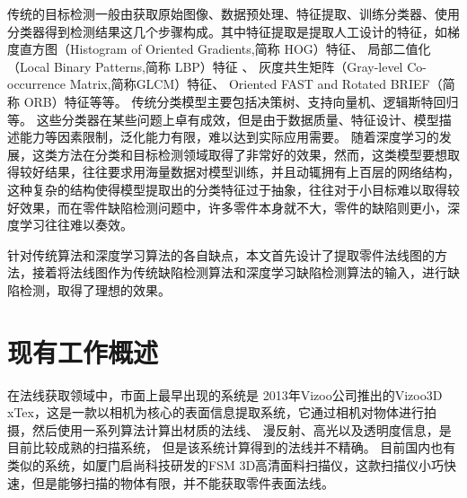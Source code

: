 传统的目标检测一般由获取原始图像、数据预处理、特征提取、训练分类器、使用分类器得到检测结果这几个步骤构成。其中特征提取是提取人工设计的特征，如梯度直方图\cite{dalal2005histograms}（Histogram of Oriented Gradients,简称 HOG）特征、
局部二值化\cite{ojala2000gray}（Local Binary Patterns,简称 LBP）特征
、
灰度共生矩阵\cite{haralick1973textural}（Gray-level Co-occurrence Matrix,简称GLCM）特征、
Oriented FAST and Rotated BRIEF\cite{rublee2011orb}（简称 ORB）特征等等。
传统分类模型主要包括决策树、支持向量机、逻辑斯特回归等。
这些分类器在某些问题上卓有成效，但是由于数据质量、特征设计、模型描述能力等因素限制，泛化能力有限，难以达到实际应用需要。
随着深度学习的发展，这类方法在分类和目标检测领域取得了非常好的效果，然而，这类模型要想取得较好结果，往往要求用海量数据对模型训练，并且动辄拥有上百层的网络结构，这种复杂的结构使得模型提取出的分类特征过于抽象，往往对于小目标难以取得较好效果，而在零件缺陷检测问题中，许多零件本身就不大，零件的缺陷则更小，深度学习往往难以奏效。

针对传统算法和深度学习算法的各自缺点，本文首先设计了提取零件法线图的方法，接着将法线图作为传统缺陷检测算法和深度学习缺陷检测算法的输入，进行缺陷检测，取得了理想的效果。

\section{现有工作概述}

在法线获取领域中，市面上最早出现的系统是
2013年Vizoo公司推出的Vizoo3D xTex，这是一款以相机为核心的表面信息提取系统，它通过相机对物体进行拍摄，然后使用一系列算法计算出材质的法线、
漫反射、高光以及透明度信息，是目前比较成熟的扫描系统，
但是该系统计算得到的法线并不精确。
目前国内也有
类似的系统，如厦门启尚科技研发的FSM 3D高清面料扫描仪，这款扫描仪小巧快
速，但是能够扫描的物体有限，并不能获取零件表面法线。

